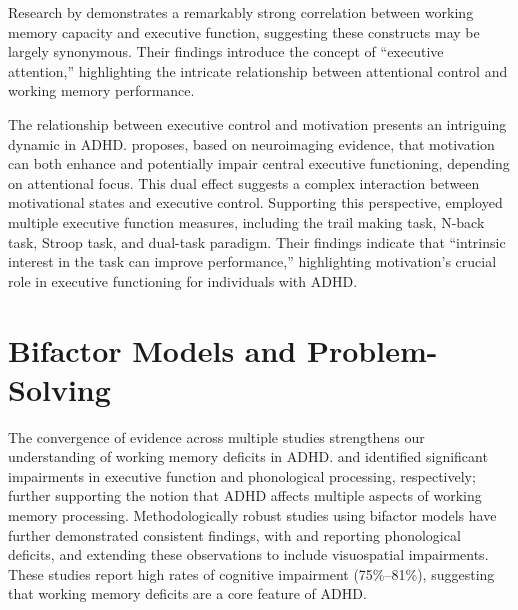 \documentclass[stu]{apa7}
\begin{document}
Research by \textcite{mccabe_relationship_2010} demonstrates a remarkably strong correlation between working memory capacity and executive function, suggesting these constructs may be largely synonymous. Their findings introduce the concept of ``executive attention,'' highlighting the intricate relationship between attentional control and working memory performance.

The relationship between executive control and motivation presents an intriguing dynamic in ADHD. \textcite{pessoa_how_2009} proposes, based on neuroimaging evidence, that motivation can both enhance and potentially impair central executive functioning, depending on attentional focus. This dual effect suggests a complex interaction between motivational states and executive control. Supporting this perspective, \textcite{elosua_differences_2017} employed multiple executive function measures, including the trail making task, N-back task, Stroop task, and dual-task paradigm. Their findings indicate that ``intrinsic interest in the task can improve performance,'' highlighting motivation's crucial role in executive functioning for individuals with ADHD.

\section{Bifactor Models and Problem-Solving}

The convergence of evidence across multiple studies strengthens our understanding of working memory deficits in ADHD. \textcite{elosua_differences_2017} and \textcite{fried_clinical_2016} identified significant impairments in executive function and phonological processing, respectively; further supporting the notion that ADHD affects multiple aspects of working memory processing. Methodologically robust studies using bifactor models have further demonstrated consistent findings, with \textcite{friedman_reading_2017} and \textcite{raiker_phonological_2019} reporting phonological deficits, and \textcite{kofler_working_2020} extending these observations to include visuospatial impairments. These studies report high rates of cognitive impairment (75\%–81\%), suggesting that working memory deficits are a core feature of ADHD.
\end{document}
